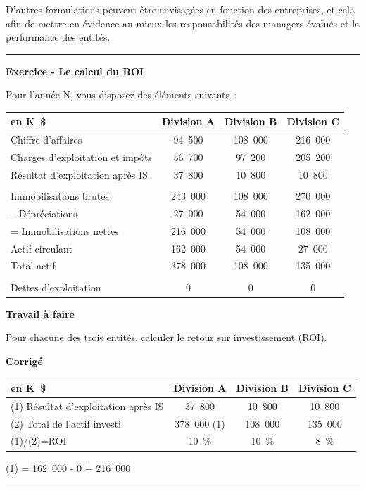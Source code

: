 \documentclass[oneside]{kaobook}
\begin{document}
D'autres formulations peuvent être envisagées en fonction des entreprises, et cela afin de mettre en évidence au mieux les responsabilités des managers évalués et la performance des entités.

\noindent\rule{\textwidth}{0.5pt}
\textbf{Exercice - Le calcul du ROI}

Pour l'année N, vous disposez des éléments suivants :
\begin{center}
\footnotesize
\begin{tabular}{l c c c}
en K \$ & Division A & Division B & Division C\\
\hline
Chiffre d'affaires & 94 500 & 108 000 & 216 000\\
Charges d'exploitation et impôts & 56 700 & 97 200 & 205 200\\
Résultat d'exploitation après IS & 37 800 & 10 800 & 10 800\\
 &  &  & \\
Immobilisations brutes & 243 000 & 108 000 & 270 000\\
-- Dépréciations & 27 000 & 54 000 & 162 000\\
= Immobilisations nettes & 216 000 & 54 000 & 108 000\\
Actif circulant & 162 000 & 54 000 & 27 000\\
Total actif & 378 000 & 108 000 & 135 000\\
 &  &  & \\
Dettes d'exploitation & 0 & 0 & 0\\
\end{tabular}
\end{center}

\textbf{Travail à faire}

Pour chacune des trois entités, calculer le retour sur investissement
(ROI).

\textbf{Corrigé}
\begin{center}
\footnotesize
\begin{tabular}{l c c c}
en K \$ & Division A & Division B & Division C\\
\hline
(1) Résultat d'exploitation après IS & 37 800 & 10 800 & 10 800\\
(2) Total de l'actif investi & 378 000 (1) & 108 000 & 135 000\\
(1)/(2)=ROI & 10 \% & 10 \% & 8 \%\\
\end{tabular}
\end{center}
(1) = 162 000 - 0 + 216 000

\noindent\rule{\textwidth}{0.5pt}
\end{document}
